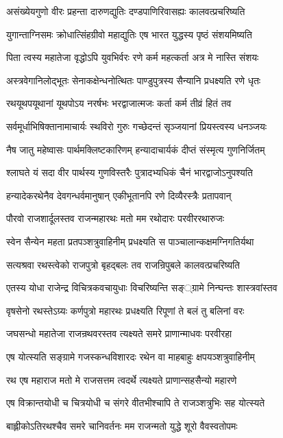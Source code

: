 \twolineshloka
{असंख्येयगुणो वीरः प्रहन्ता दारुणद्युतिः}
{दण्डपाणिरिवासह्यः कालवत्प्रचरिष्यति}


\twolineshloka
{युगान्ताग्निसमः क्रोधात्सिंहग्रीवो महाद्युतिः}
{एष भारत युद्धस्य पृष्ठं संशयमिष्यति}


\twolineshloka
{पिता त्वस्य महातेजा वृद्धोऽपि युवभिर्वरः}
{रणे कर्म महत्कर्ता अत्र मे नास्ति संशयः}


\twolineshloka
{अस्त्रवेगानिलोद्भूतः सेनाकक्षेन्धनोत्थितः}
{पाण्डुपुत्रस्य सैन्यानि प्रधक्ष्यति रणे धृतः}


\twolineshloka
{रथयूथपयूथानां यूथपोऽय नरर्षभः}
{भरद्वाजात्मजः कर्ता कर्म तीव्रं हितं तव}


\twolineshloka
{सर्वमूर्धाभिषिक्तानामाचार्यः स्थविरो गुरुः}
{गच्छेदन्तं सृञ्जयानां प्रियस्त्वस्य धनञ्जयः}


\twolineshloka
{नैष जातु महेष्वासः पार्थमक्लिष्टकारिणम्}
{हन्यादाचार्यकं दीप्तं संस्मृत्य गुणनिर्जितम्}


\twolineshloka
{श्लाघते यं सदा वीर पार्थस्य गुणविस्तरैः}
{पुत्रादभ्यधिकं चैनं भारद्वाजोऽनुपश्यति}


\twolineshloka
{हन्यादेकरथेनैव देवगन्धर्वमानुषान्}
{एकीभूतानपि रणे दिव्यैरस्त्रैः प्रतापवान्}


\twolineshloka
{पौरवो राजशार्दूलस्तव राजन्महारथः}
{मतो मम रथोदारः परवीररथारुजः}


\twolineshloka
{स्वेन सैन्येन महता प्रतपञ्शत्रुवाहिनीम्}
{प्रधक्ष्यति स पाञ्चालान्कक्षमग्निगतिर्यथा}


\twolineshloka
{सत्यश्रवा रथस्त्वेको राजपुत्रो बृहद्बलः}
{तव राजन्रिपुबले कालवत्प्रचरिष्यति}


\twolineshloka
{एतस्य योधा राजेन्द्र विचित्रकवचायुधाः}
{विचरिष्यन्ति सङ््ग्रामे निन्घन्तः शास्त्रवांस्तव}


\twolineshloka
{वृषसेनो रथस्तेऽग्र्यः कर्णपुत्रो महारथः}
{प्रधक्ष्यति रिपूणां ते बलं तु बलिनां वरः}


\twolineshloka
{जघसन्धो महातेजा राजन्रथवरस्तव}
{त्यक्ष्यते समरे प्राणान्माधवः परवीरहा}


\twolineshloka
{एष योत्स्यति सङ्ग्रामे गजस्कन्धविशारदः}
{रथेन वा माहबाहुः क्षपयञ्शत्रुवाहिनीम्}


\twolineshloka
{रथ एष महाराज मतो मे राजसत्तम}
{त्वदर्थे त्यक्ष्यते प्राणान्सहसैन्यो महारणे}


\twolineshloka
{एष विक्रान्तयोधी च चित्रयोधी च संगरे}
{वीतभीश्चापि ते राजञ्शत्रुभिः सह योत्स्यते}


\twolineshloka
{बाह्लीकोऽतिरथश्चैव समरे चानिवर्तनः}
{मम राजन्मतो युद्धे शूरो वैवस्वतोपमः}


